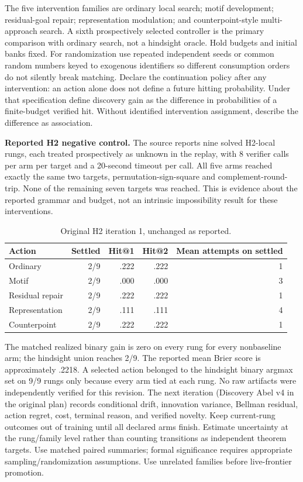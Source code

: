 \documentclass[11pt]{article}
\theoremstyle{definition}\newtheorem{definition}[theorem]{Definition}\newtheorem{example}[theorem]{Example}\newtheorem{conjecture}[theorem]{Conjecture}
\begin{document}
The five intervention families are ordinary local search; motif development; residual-goal repair; representation modulation; and counterpoint-style multi-approach search. A sixth prospectively selected controller is the primary comparison with ordinary search, not a hindsight oracle. Hold budgets and initial banks fixed. For randomization use repeated independent seeds or common random numbers keyed to exogenous identifiers so different consumption orders do not silently break matching. Declare the continuation policy after any intervention: an action alone does not define a future hitting probability. Under that specification define discovery gain as the difference in probabilities of a finite-budget verified hit. Without identified intervention assignment, describe the difference as association.

\textbf{Reported H2 negative control.} The source reports nine solved H2-local rungs, each treated prospectively as unknown in the replay, with 8 verifier calls per arm per target and a 20-second timeout per call. All five arms reached exactly the same two targets, permutation-sign-square and complement-round-trip. None of the remaining seven targets was reached. This is evidence about the reported grammar and budget, not an intrinsic impossibility result for these interventions.
\begin{table}[ht]\centering\small
\begin{tabular}{lrrrr}\toprule Action&Settled&Hit@1&Hit@2&Mean attempts on settled\\\midrule Ordinary&2/9&.222&.222&1\\Motif&2/9&.000&.000&3\\Residual repair&2/9&.222&.222&1\\Representation&2/9&.111&.111&4\\Counterpoint&2/9&.222&.222&1\\\bottomrule\end{tabular}
\caption{Original H2 iteration 1, unchanged as reported.}\end{table}
The matched realized binary gain is zero on every rung for every nonbaseline arm; the hindsight union reaches 2/9. The reported mean Brier score is approximately .2218. A selected action belonged to the hindsight binary argmax set on 9/9 rungs only because every arm tied at each rung. No raw artifacts were independently verified for this revision. The next iteration (Discovery Abel v4 in the original plan) records conditional drift, innovation variance, Bellman residual, action regret, cost, terminal reason, and verified novelty. Keep current-rung outcomes out of training until all declared arms finish. Estimate uncertainty at the rung/family level rather than counting transitions as independent theorem targets. Use matched paired summaries; formal significance requires appropriate sampling/randomization assumptions. Use unrelated families before live-frontier promotion.
\end{document}
